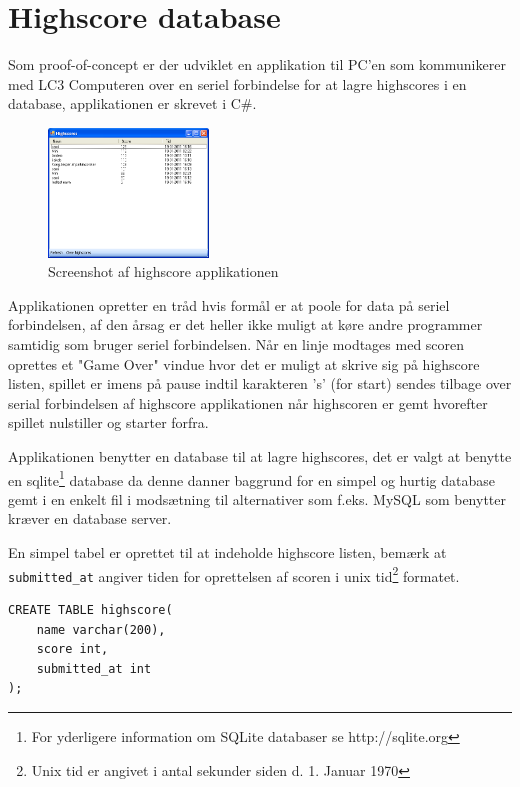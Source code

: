 \section{Highscore database}
Som proof-of-concept er der udviklet en applikation til PC'en som kommunikerer med LC3 Computeren over en seriel forbindelse for at lagre highscores i en database, applikationen er skrevet i C\#.

\begin{figure}
  \begin{center}
    \includegraphics[width=0.38\textwidth]{billeder/HighscoreBoard}
  \end{center}
  \caption{Screenshot af highscore applikationen}
\end{figure}

Applikationen opretter en tråd hvis formål er at poole for data på seriel forbindelsen, af den årsag er det heller ikke muligt at køre andre programmer samtidig som bruger seriel forbindelsen. Når en linje modtages med scoren oprettes et "Game Over" vindue hvor det er muligt at skrive sig på highscore listen, spillet er imens på pause indtil karakteren 's' (for start) sendes tilbage over serial forbindelsen af highscore applikationen når highscoren er gemt hvorefter spillet nulstiller og starter forfra.

Applikationen benytter en database til at lagre highscores, det er valgt at benytte en sqlite\footnote{For yderligere information om SQLite databaser se http://sqlite.org} database da denne danner baggrund for en simpel og hurtig database gemt i en enkelt fil i modsætning til alternativer som f.eks. MySQL som benytter kræver en database server.

En simpel tabel er oprettet til at indeholde highscore listen, bemærk at \texttt{submitted\_at} angiver tiden for oprettelsen af scoren i unix tid\footnote{Unix tid er angivet i antal sekunder siden d. 1. Januar 1970} formatet.


\lstset{language=SQL}
\begin{lstlisting}
CREATE TABLE highscore(
	name varchar(200),
	score int,
	submitted_at int
);
\end{lstlisting}


